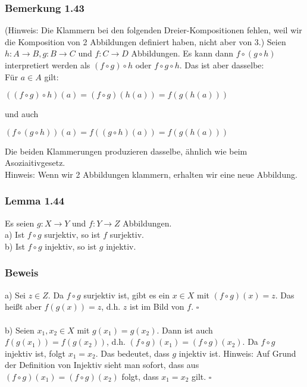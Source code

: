 \documentclass{article}
\begin{document}
\subsubsection*{Bemerkung 1.43}
(Hinweis: Die Klammern bei den folgenden Dreier-Kompositionen fehlen, weil wir die Komposition von 2 Abbildungen definiert haben, nicht aber von 3.) Seien $h: A \rightarrow B, g: B \rightarrow C$ und $f: C \rightarrow D$ Abbildungen. Es kann dann $f \circ (g \circ h)$ interpretiert werden als $(f \circ g) \circ h$ oder $f \circ g \circ h$. Das ist aber dasselbe: \\
Für $a \in A$ gilt: 
\begin{center}
    $((f \circ g) \circ h)(a) = (f \circ g)(h(a)) = f(g(h(a)))$
\end{center}
und auch 
\begin{center}
    $(f \circ (g \circ h))(a) = f((g \circ h)(a)) = f(g(h(a)))$
\end{center}
Die beiden Klammerungen produzieren dasselbe, ähnlich wie beim Asoziaitivgesetz. \\
Hinweis: Wenn wir 2 Abbildungen klammern, erhalten wir eine neue Abbildung.


\subsubsection*{Lemma 1.44}
Es seien $g: X \rightarrow Y$ und $f: Y \rightarrow Z$ Abbildungen.\\
a) Ist $f \circ g$ surjektiv, so ist $f$ surjektiv. \\
b) Ist $f \circ g$ injektiv, so ist $g$ injektiv. \\

\subsubsection*{Beweis}
a) Sei $z \in Z$. Da $f \circ g$ surjektiv ist, gibt es ein $x \in X$ mit $(f \circ g)(x) = z$. Das heißt aber $f(g(x)) = z$, d.h. $z$ ist im Bild von $f$. $\square$ \\
\\
b) Seien $x_1, x_2 \in X$ mit $g(x_1) = g(x_2)$. Dann ist auch $f(g(x_1)) = f(g(x_2))$, d.h. $(f \circ g)(x_1) = (f \circ g)(x_2)$. Da $f \circ g$ injektiv ist, folgt $x_1 = x_2$. Das bedeutet, dass $g$ injektiv ist. Hinweis: 
Auf Grund der Definition von Injektiv sieht man sofort, dass aus $(f \circ g)(x_1) = (f \circ g)(x_2)$ folgt, dass $x_1 = x_2$ gilt. $\square$ \\
\end{document}

